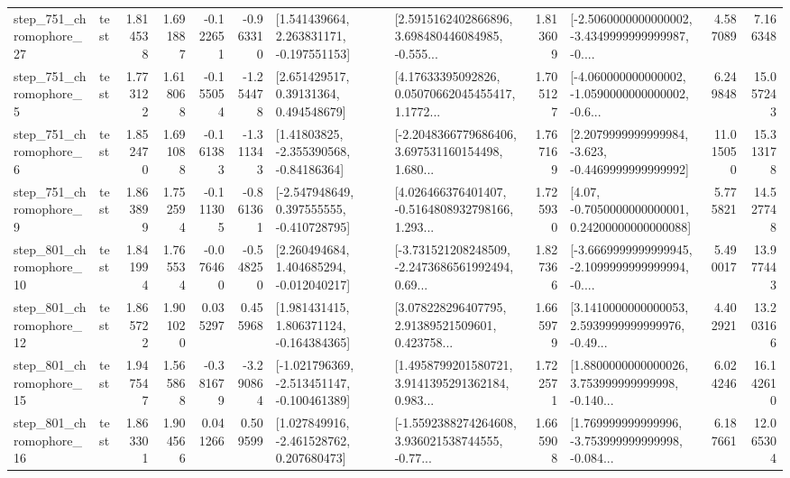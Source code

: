 \begin{tabular}{llrrrrllrlrr}
  step\_751\_chromophore\_27 &      test &      1.814538 &    1.691887 &     -0.122651 & -0.963310 &    [1.541439664, 2.263831171, -0.197551153] &  [2.5915162402866896, 3.698480446084985, -0.555... &       1.813609 &  [-2.5060000000000002, -3.4349999999999987, -0.... &            4.587089 &          7.166348 \\
   step\_751\_chromophore\_5 &      test &      1.773122 &    1.618068 &     -0.155054 & -1.254478 &      [2.651429517, 0.39131364, 0.494548679] &  [4.17633395092826, 0.05070662045455417, 1.1772... &       1.705127 &  [-4.060000000000002, -1.0590000000000002, -0.6... &            6.249848 &         15.057243 \\
   step\_751\_chromophore\_6 &      test &      1.852470 &    1.691088 &     -0.161383 & -1.311343 &     [1.41803825, -2.355390568, -0.84186364] &  [-2.2048366779686406, 3.697531160154498, 1.680... &       1.767169 &  [2.2079999999999984, -3.623, -0.4469999999999992] &           11.015050 &         15.313178 \\
   step\_751\_chromophore\_9 &      test &      1.863899 &    1.752594 &     -0.111305 & -0.861361 &   [-2.547948649, 0.397555555, -0.410728795] &  [4.026466376401407, -0.5164808932798166, 1.293... &       1.725930 &   [4.07, -0.7050000000000001, 0.24200000000000088] &            5.775821 &         14.527748 \\
  step\_801\_chromophore\_10 &      test &      1.841994 &    1.765534 &     -0.076460 & -0.548250 &    [2.260494684, 1.404685294, -0.012040217] &  [-3.731521208248509, -2.2473686561992494, 0.69... &       1.827366 &  [-3.6669999999999945, -2.1099999999999994, -0.... &            5.490017 &         13.977443 \\
  step\_801\_chromophore\_12 &      test &      1.865722 &    1.901020 &      0.035297 &  0.455968 &    [1.981431415, 1.806371124, -0.164384365] &  [3.078228296407795, 2.91389521509601, 0.423758... &       1.665979 &  [3.1410000000000053, 2.5939999999999976, -0.49... &            4.402921 &         13.203166 \\
  step\_801\_chromophore\_15 &      test &      1.947547 &    1.565868 &     -0.381679 & -3.290864 &  [-1.021796369, -2.513451147, -0.100461389] &  [1.4958799201580721, 3.9141395291362184, 0.983... &       1.722571 &  [1.8800000000000026, 3.753999999999998, -0.140... &            6.024246 &         16.142610 \\
  step\_801\_chromophore\_16 &      test &      1.863301 &    1.904566 &      0.041266 &  0.509599 &    [1.027849916, -2.461528762, 0.207680473] &  [-1.5592388274264608, 3.936021538744555, -0.77... &       1.665908 &  [1.769999999999996, -3.753999999999998, -0.084... &            6.187661 &         12.065304 \\

\end{tabular}
